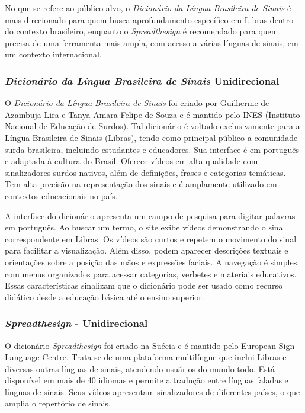 \documentclass[portuguese]{textolivre}
\begin{document}
No que se refere ao público-alvo, o \textit{Dicionário da Língua Brasileira de Sinais} é mais direcionado para quem busca aprofundamento específico em Libras dentro do contexto brasileiro, enquanto o \textit{Spreadthesign} é recomendado para quem precisa de uma ferramenta mais ampla, com acesso a várias línguas de sinais, em um contexto internacional.

\subsubsection{\textit{Dicionário da Língua Brasileira de Sinais} Unidirecional}

O \textit{Dicionário da Língua Brasileira de Sinais} foi criado por Guilherme de Azambuja Lira e Tanya Amara Felipe de Souza e é mantido pelo INES (Instituto Nacional de Educação de Surdos). Tal dicionário é voltado exclusivamente para a Língua Brasileira de Sinais (Libras), tendo como principal público a comunidade surda brasileira, incluindo estudantes e educadores. Sua interface é em português e adaptada à cultura do Brasil. Oferece vídeos em alta qualidade com sinalizadores surdos nativos, além de definições, frases e categorias temáticas. Tem alta precisão na representação dos sinais e é amplamente utilizado em contextos educacionais no país.

A interface do dicionário apresenta um campo de pesquisa para digitar palavras em português. Ao buscar um termo, o site exibe vídeos demonstrando o sinal correspondente em Libras. Os vídeos são curtos e repetem o movimento do sinal para facilitar a visualização. Além disso, podem aparecer descrições textuais e orientações sobre a posição das mãos e expressões faciais. A navegação é simples, com menus organizados para acessar categorias, verbetes e materiais educativos. Essas características sinalizam que o dicionário pode ser usado como recurso didático desde a educação básica até o ensino superior.

\subsubsection{\textit{Spreadthesign} - Unidirecional}
O dicionário \textit{Spreadthesign} foi criado na Suécia e é mantido pelo European Sign Language Centre. Trata-se de uma plataforma multilíngue que inclui Libras e diversas outras línguas de sinais, atendendo usuários do mundo todo. Está disponível em mais de 40 idiomas e permite a tradução entre línguas faladas e línguas de sinais. Seus vídeos apresentam sinalizadores de diferentes países, o que amplia o repertório de sinais.
\end{document}
